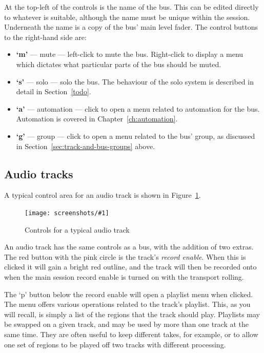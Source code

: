 \documentclass[10pt,a4paper]{book}
\newcommand{\todo}[1]{\marginpar{\small\texttt{#1}}}
\newcommand{\screenshot}[3]{%
\begin{figure}[ht]%
\begin{center}
\texttt{[image: screenshots/\#1]}
\end{center}
\caption{#2}
\label{#3}
\end{figure}}
\begin{document}
{At the top-left of the controls is the name of the bus.  This can be
edited directly to whatever is suitable, although the name must be
unique within the session.  Underneath the name is a copy of the bus'
main level fader.  The control buttons to the right-hand side are:

\begin{itemize}
\item \textbf{`m'} --- mute --- left-click to mute the bus.
  Right-click to display a menu which dictates what particular parts
  of the bus should be muted. \todo{detail of muting options}
\item \textbf{`s'} --- solo --- solo the bus.  The behaviour of the
  solo system is described in detail in Section~\ref{todo}.
\item \textbf{`a'} --- automation --- click to open a menu related to
  automation for the bus.  Automation is covered in Chapter~\ref{ch:automation}.
\item \textbf{`g'} --- group --- click to open a menu related to the
  bus' group, as discussed in Section~\ref{sec:track-and-bus-groups} above.
\end{itemize}


\subsection{Audio tracks}

A typical control area for an audio track is shown in Figure~\ref{fig:typical-audio-track-controls}.

\screenshot{typical-audio-track-controls.png}{Controls for a typical audio track}{fig:typical-audio-track-controls}

An audio track has the same controls as a bus, with the addition of
two extras.  The red button with the pink circle is the track's
\emph{record enable}.  When this is clicked it will gain a bright red
outline, and the track will then be recorded onto when the main
session record enable is turned on with the transport rolling.

The `p' button below the record enable will open a playlist menu when
clicked.  The menu offers various operations related to the track's
playlist.  This, as you will recall, is simply a list of the
regions that the track should play.  Playlists may be swapped on a
given track, and may be used by more than one track at the same time.
They are often useful to keep different takes, for example, or to
allow one set of regions to be played off two tracks with different
processing.

}
\end{document}

